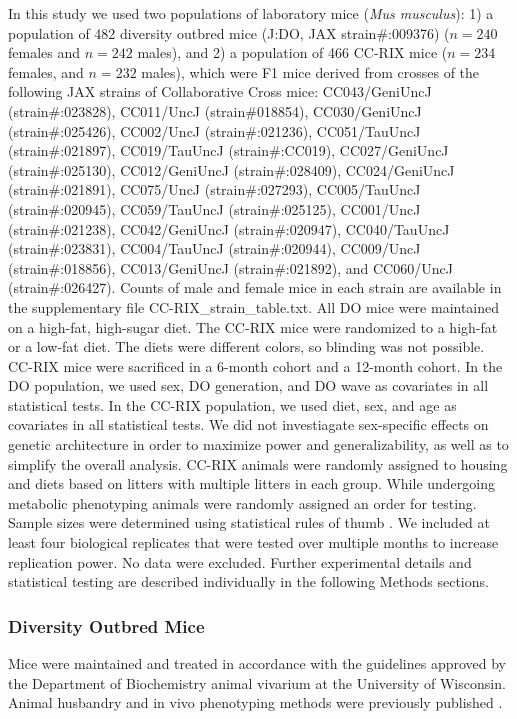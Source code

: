 \documentclass[
]{article}
\begin{document}
In this study we used two populations of laboratory mice
(\textit{Mus musculus}): 1) a population of 482 diversity outbred mice
(J:DO, JAX strain\#:009376) (\(n = 240\) females and \(n = 242\) males),
and 2) a population of 466 CC-RIX mice (\(n = 234\) females, and
\(n = 232\) males), which were F1 mice derived from crosses of the
following JAX strains of Collaborative Cross mice: CC043/GeniUncJ
(strain\#:023828), CC011/UncJ (strain\#018854), CC030/GeniUncJ
(strain\#:025426), CC002/UncJ (strain\#:021236), CC051/TauUncJ
(strain\#:021897), CC019/TauUncJ (strain\#:CC019), CC027/GeniUncJ
(strain\#:025130), CC012/GeniUncJ (strain\#:028409), CC024/GeniUncJ
(strain\#:021891), CC075/UncJ (strain\#:027293), CC005/TauUncJ
(strain\#:020945), CC059/TauUncJ (strain\#:025125), CC001/UncJ
(strain\#:021238), CC042/GeniUncJ (strain\#:020947), CC040/TauUncJ
(strain\#:023831), CC004/TauUncJ (strain\#:020944), CC009/UncJ
(strain\#:018856), CC013/GeniUncJ (strain\#:021892), and CC060/UncJ
(strain\#:026427). Counts of male and female mice in each strain are
available in the supplementary file CC-RIX\_strain\_table.txt. All DO
mice were maintained on a high-fat, high-sugar diet. The CC-RIX mice
were randomized to a high-fat or a low-fat diet. The diets were
different colors, so blinding was not possible. CC-RIX mice were
sacrificed in a 6-month cohort and a 12-month cohort. In the DO
population, we used sex, DO generation, and DO wave as covariates in all
statistical tests. In the CC-RIX population, we used diet, sex, and age
as covariates in all statistical tests. We did not investiagate
sex-specific effects on genetic architecture in order to maximize power
and generalizability, as well as to simplify the overall analysis.
CC-RIX animals were randomly assigned to housing and diets based on
litters with multiple litters in each group. While undergoing metabolic
phenotyping animals were randomly assigned an order for testing. Sample
sizes were determined using statistical rules of thumb
\cite{van2011statistical}. We included at least four biological
replicates that were tested over multiple months to increase replication
power. No data were excluded. Further experimental details and
statistical testing are described individually in the following Methods
sections.

\subsubsection{Diversity Outbred Mice}\label{diversity-outbred-mice}

Mice were maintained and treated in accordance with the guidelines
approved by the Department of Biochemistry animal vivarium at the
University of Wisconsin. Animal husbandry and in vivo phenotyping
methods were previously published \cite{pmid31343992, pmid29567659}.
\end{document}
